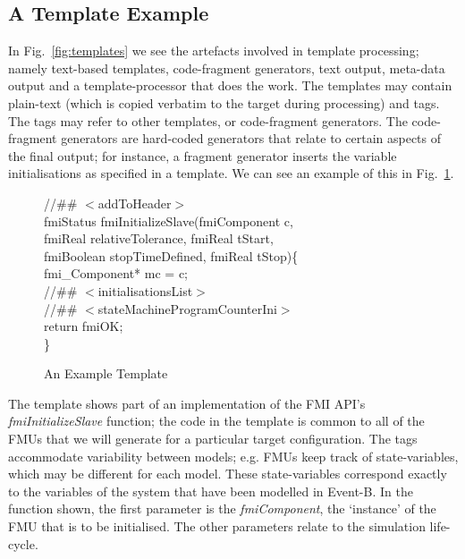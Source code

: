 \documentclass{llncs}%
\begin{document}
\subsection{A Template Example}
In Fig.~\ref{fig:templates} we see the artefacts involved in template processing; namely text-based templates, code-fragment generators, text output, meta-data output and a template-processor that does the work. The templates may contain plain-text (which is copied verbatim to the target during processing) and tags. The tags may refer to other templates, or code-fragment generators. The code-fragment generators are hard-coded generators that relate to certain aspects of the final output; for instance, a fragment generator inserts the variable initialisations as specified in a template. We can see an example of this in Fig.~\ref{fig:templateExample}. 
%
\begin{figure}[t]
\begin{center}
\begin{minipage}{0.6\textwidth}
//\#\# $<$addToHeader$>$\\
fmiStatus fmiInitializeSlave(fmiComponent c,\\
\hspace*{0.2cm}fmiReal relativeTolerance, fmiReal tStart,\\
\hspace*{0.2cm}fmiBoolean stopTimeDefined, fmiReal tStop)\{\\
\hspace*{0.4cm}fmi\_Component* mc = c;\\
\hspace*{0.4cm}//\#\# $<$initialisationsList$>$\\
\hspace*{0.4cm}//\#\# $<$stateMachineProgramCounterIni$>$\\
\hspace*{0.4cm}return fmiOK;\\
\}
\caption{An Example Template}
\label{fig:templateExample}
\end{minipage}
\end{center}
\end{figure}
%
%
The template shows part of an implementation of the FMI API's \emph{fmiInitializeSlave} function; the code in the template is common to all of the FMUs that we will generate for a particular target configuration. The tags accommodate variability between models; e.g. FMUs keep track of state-variables, which may be different for each model. These state-variables correspond exactly to the variables of the system that have been modelled in Event-B. In the function shown, the first parameter is the \emph{fmiComponent}, the `instance' of the FMU that is to be initialised. The other parameters relate to the simulation life-cycle.  
\end{document}
